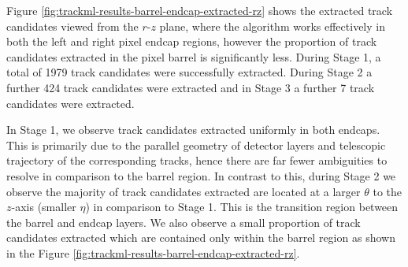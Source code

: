 Figure \ref{fig:trackml-results-barrel-endcap-extracted-rz} shows the extracted track candidates viewed from the $r$-$z$ plane, where the algorithm works effectively in both the left and right pixel endcap regions, however the proportion of track candidates extracted in the pixel barrel is significantly less. During Stage 1, a total of 1979 track candidates were successfully extracted. During Stage 2 a further 424 track candidates were extracted and in Stage 3 a further 7 track candidates were extracted.

In Stage 1, we observe track candidates extracted uniformly in both endcaps. This is primarily due to the parallel geometry of detector layers and telescopic trajectory of the corresponding tracks, hence there are far fewer ambiguities to resolve in comparison to the barrel region. In contrast to this, during Stage 2 we observe the majority of track candidates extracted are located at a larger $\theta$ to the $z$-axis (smaller $\eta$) in comparison to Stage 1. This is the transition region between the barrel and endcap layers. We also observe a small proportion of track candidates extracted which are contained only within the barrel region as shown in the Figure \ref{fig:trackml-results-barrel-endcap-extracted-rz}.


